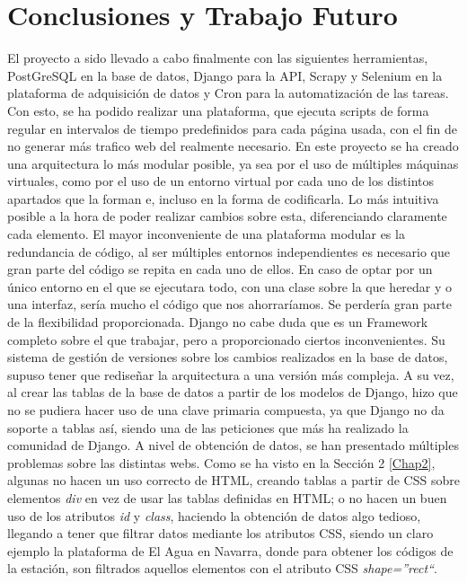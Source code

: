\chapter[Conclusiones y Trabajo Futuro]{Conclusiones y Trabajo Futuro}
\label{Chap6}

El proyecto a sido llevado a cabo finalmente con las siguientes herramientas, PostGreSQL en la base de datos, Django para la API, Scrapy y Selenium en la plataforma de adquisición de datos y Cron para la automatización de las tareas. Con esto, se ha podido realizar una plataforma, que ejecuta scripts de forma regular en intervalos de tiempo predefinidos para cada página usada, con el fin de no generar más trafico web del realmente necesario.\newline
\newline
En este proyecto se ha creado una arquitectura lo más modular posible, ya sea por el uso de múltiples máquinas virtuales, como por el uso de un entorno virtual por cada uno de los distintos apartados que la forman e, incluso en la forma de codificarla. Lo más intuitiva posible a la hora de poder realizar cambios sobre esta, diferenciando claramente cada elemento.\newline
\newline
El mayor inconveniente de una plataforma modular es la redundancia de código, al ser múltiples entornos independientes es necesario que gran parte del código se repita en cada uno de ellos. En caso de optar por un único entorno en el que se ejecutara todo, con una clase sobre la que heredar y o una interfaz, sería mucho el código que nos ahorraríamos. Se perdería gran parte de la flexibilidad proporcionada.\newline
\newline
Django no cabe duda que es un Framework completo sobre el que trabajar, pero a proporcionado ciertos inconvenientes. Su sistema de gestión de versiones sobre los cambios realizados en la base de datos, supuso tener que rediseñar la arquitectura a una versión más compleja. A su vez, al crear las tablas de la base de datos a partir de los modelos de Django, hizo que no se pudiera hacer uso de una clave primaria compuesta, ya que Django no da soporte a tablas así, siendo una de las peticiones que más ha realizado la comunidad de Django.\newline
\newline
A nivel de obtención de datos, se han presentado múltiples problemas sobre las distintas webs. Como se ha visto en la Sección 2 \ref{Chap2}, algunas no hacen un uso correcto de HTML, creando tablas a partir de CSS sobre elementos \textit{div} en vez de usar las tablas definidas en HTML; o no hacen un buen uso de los atributos \textit{id} y \textit{class}, haciendo la obtención de datos algo tedioso, llegando a tener que filtrar datos mediante los atributos CSS, siendo un claro ejemplo la plataforma de El Agua en Navarra, donde para obtener los códigos de la estación, son filtrados aquellos elementos con el atributo CSS \textit{shape=''rect``}.\newline
